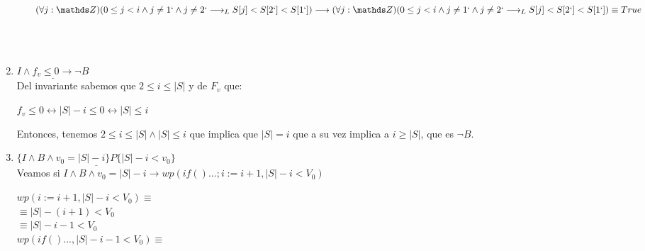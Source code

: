 \documentclass[10pt,a4paper]{article}
\begin{document}
\begin{enumerate}
\begin{itemize}
            $(\forall j : \ent)(0\leq j < i \land j\neq 1` \land j \neq 2`\longrightarrow_L S[j]<S[2`]<S[1`]) \longrightarrow (\forall j : \ent)(0\leq j < i \land j\neq 1` \land j \neq 2`\longrightarrow_L S[j]<S[2`]<S[1`]) \equiv True$

        \end{itemize}

    \\
    \\



        
        
    \item $\underline{I \land  f_v \leq 0 \longrightarrow \neg B}$ \\
    \text Del invariante sabemos que $2\leq i \leq |S|$ y de $F_v$ que:
    \begin{center}
        $f_v \leq 0 \longleftrightarrow |S| - i \leq 0 \longleftrightarrow |S| \leq i$
    \end{center}
    \text Entonces, tenemos $2\leq i \leq |S| \land |S| \leq i$ que implica que $|S| = i$ que a su vez implica a $i \geq |S|$, que es $\neg{B}$.

    \item $\underline{ \{ I \land B \land v_0=|S|-i \}P\{ |S|-i<v_0\} }$ \\

    \text Veamos si $I\land B \land v_0 = |S| - i \longrightarrow
    wp(if() ... ; i:= i + 1, |S| - i < V_0)$

    $wp(i := i +1, |S| - i < V_0) \equiv$ \\
    $\equiv |S| - (i+1) < V_0$ \\
    $\equiv |S| - i - 1 < V_0$ \\

    $wp(if()..., |S| - i - 1 < V_0) \equiv$ \\
    

\end{enumerate}
\end{document}
